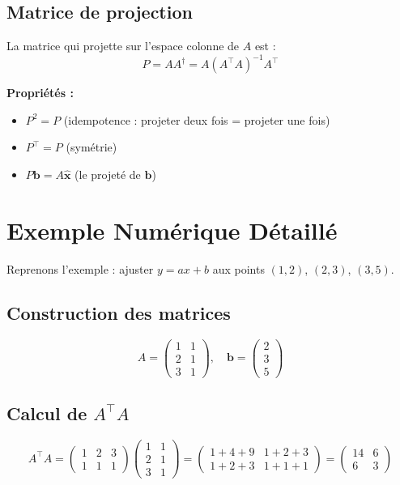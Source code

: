 \documentclass[12pt,a4paper]{article}
\newcommand{\T}{^\top}
\newcommand{\pinv}{^\dagger}
\begin{document}
\subsection{Matrice de projection}

La matrice qui projette sur l'espace colonne de $A$ est :
\begin{equation}
P = A A\pinv = A(A\T A)^{-1} A\T
\end{equation}

\textbf{Propriétés :}
\begin{itemize}
    \item $P^2 = P$ \quad (idempotence : projeter deux fois = projeter une fois)
    \item $P\T = P$ \quad (symétrie)
    \item $P \mathbf{b} = A\hat{\mathbf{x}}$ \quad (le projeté de $\mathbf{b}$)
\end{itemize}

\newpage
\section{Exemple Numérique Détaillé}

Reprenons l'exemple : ajuster $y = ax + b$ aux points $(1, 2)$, $(2, 3)$, $(3, 5)$.

\subsection{Construction des matrices}

\[
A = \begin{pmatrix} 1 & 1 \\ 2 & 1 \\ 3 & 1 \end{pmatrix}, \quad
\mathbf{b} = \begin{pmatrix} 2 \\ 3 \\ 5 \end{pmatrix}
\]

\subsection{Calcul de $A\T A$}

\[
A\T A = \begin{pmatrix} 1 & 2 & 3 \\ 1 & 1 & 1 \end{pmatrix}
\begin{pmatrix} 1 & 1 \\ 2 & 1 \\ 3 & 1 \end{pmatrix}
= \begin{pmatrix} 1+4+9 & 1+2+3 \\ 1+2+3 & 1+1+1 \end{pmatrix}
= \begin{pmatrix} 14 & 6 \\ 6 & 3 \end{pmatrix}
\]
\end{document}

